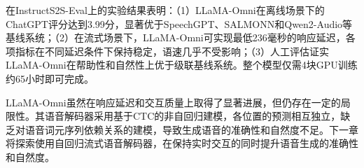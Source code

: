 在InstructS2S-Eval上的实验结果表明：（1）LLaMA-Omni在离线场景下的ChatGPT评分达到3.99分，显著优于SpeechGPT、SALMONN和Qwen2-Audio等基线系统；（2）在流式场景下，LLaMA-Omni可实现最低236毫秒的响应延迟，各项指标在不同延迟条件下保持稳定，语速几乎不受影响；（3）人工评估证实LLaMA-Omni在帮助性和自然性上优于级联基线系统。整个模型仅需4块GPU训练约65小时即可完成。

LLaMA-Omni虽然在响应延迟和交互质量上取得了显著进展，但仍存在一定的局限性。其语音解码器采用基于CTC的非自回归建模，各位置的预测相互独立，缺乏对语音词元序列依赖关系的建模，导致生成语音的准确性和自然度不足。下一章将探索使用自回归流式语音解码器，在保持实时交互的同时提升语音生成的准确性和自然度。
